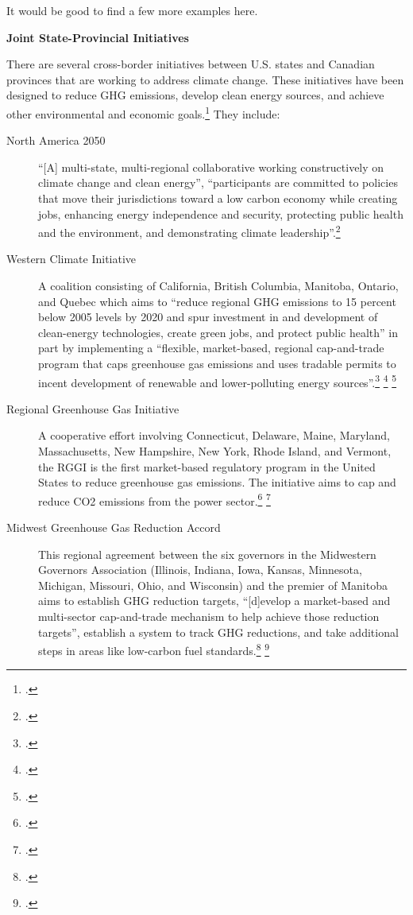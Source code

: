 \begin{vcom}
It would be good to find a few more examples here.
\end{vcom}



\textbf{Joint State-Provincial Initiatives}



There are several cross-border initiatives between U.S. states and Canadian provinces that are working to address climate change. These initiatives have been designed to reduce GHG emissions, develop clean energy sources, and achieve other environmental and economic goals.\footcite[][]{CCESinitiatives} They include:
\begin{description}
	\item[North America 2050] ``[A] multi-state, multi-regional collaborative working constructively on climate change and clean energy'', ``participants are committed to policies that move their jurisdictions toward a low carbon economy while creating jobs, enhancing energy independence and security, protecting public health and the environment, and demonstrating climate leadership''.\footcite[][]{CCESinitiatives}
	\item[Western Climate Initiative] A coalition consisting of California, British Columbia, Manitoba, Ontario, and Quebec which aims to ``reduce regional GHG emissions to 15 percent below 2005 levels by 2020 and spur investment in and development of clean-energy technologies, create green jobs, and protect public health'' in part by implementing a ``flexible, market-based, regional cap-and-trade program that caps greenhouse gas emissions and uses tradable permits to incent development of renewable and lower-polluting energy sources''.\footcite[][]{WCIPartners} \footcite[][]{WCIProgram} \footcite[][]{CCESinitiatives}
	\item[Regional Greenhouse Gas Initiative] A cooperative effort involving Connecticut, Delaware, Maine, Maryland, Massachusetts, New Hampshire, New York, Rhode Island, and Vermont, the RGGI is the first market-based regulatory program in the United States to reduce greenhouse gas emissions. The initiative aims to cap and reduce CO2 emissions from the power sector.\footcite[][]{RGGIWelcome} \footcite[][]{CCESinitiatives}
	\item[Midwest Greenhouse Gas Reduction Accord] This regional agreement between the six governors in the Midwestern Governors Association (Illinois, Indiana, Iowa, Kansas, Minnesota, Michigan, Missouri, Ohio, and Wisconsin) and the premier of Manitoba aims to establish GHG reduction targets, ``[d]evelop a market-based and multi-sector cap-and-trade mechanism to help achieve those reduction targets'', establish a system to track GHG reductions, and take additional steps in areas like low-carbon fuel standards.\footcite[][]{GovsClimatePlatform} \footcite[][]{CCESinitiatives}

\end{description}
